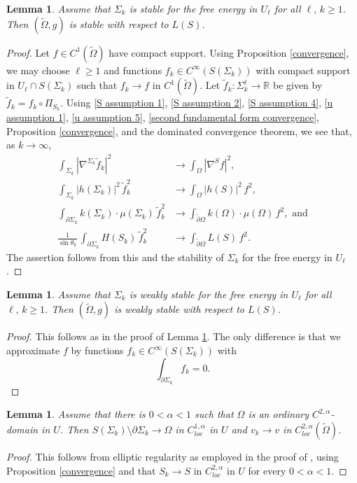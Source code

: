 \documentclass[11pt]{amsart}
\newtheorem{lem}[prop]{Lemma}
\begin{document}
\begin{lem} \label{stability lem} Assume that $\Sigma_k$ is stable for the free energy in $U_\ell$ for all $\ell,\,k\geq 1$.
 Then $(\tilde \Omega,g)$ is stable with respect to $L(S)$.  
\end{lem}
\begin{proof}
	Let $f\in C^1(\tilde \Omega)$ have compact support.
 Using Proposition \ref{convergence},  we may choose $\ell \geq 1$ and functions $f_k\in C^\infty(S(\Sigma_k))$ with compact support in $U_\ell\cap S(\Sigma_k)$ such that $f_k\to f$ in $C^1(\tilde \Omega)$. Let $\tilde f_k:\Sigma^{\ell}_k\to \mathbb{R}$ be given by $\tilde f_k=f_k\circ \Pi_{S_k}$. Using \eqref{S assumption 1}, \eqref{S assumption 2}, \eqref{S assumption 4}, \eqref{u assumption 1}, \eqref{u assumption 5}, \eqref{second fundamental form convergence},  Proposition \ref{convergence}, and the dominated convergence theorem, we see that, as $k\to\infty$,
\begin{align*} 
		\int_{\Sigma_k}|\nabla^{\Sigma_k}\tilde f_k|^2&\to \int_{\Omega}|\nabla^S f|^2,\\
		\int_{\Sigma_k}|h( \Sigma_k)|^2\,\tilde f_k^2&\to \int_{\Omega} |h(S)|^2\,f^2,\\
	\int_{\partial \Sigma_k}k( \Sigma_k)\cdot \mu(\Sigma_k)\,\tilde f_k^2&\to \int_{\tilde \partial \Omega}k( \Omega)\cdot \mu(\Omega)\,f^2,\text{ and}\\
	\frac{1}{\sin\theta_k}\,\int_{ \partial \Sigma_k}H(S_k)\,\tilde f_k^2&\to \int_{\tilde \partial \Omega} L(S)\,f^2.
	\end{align*}
The assertion follows from this and the stability of $\Sigma_k$ for the free energy in $U_\ell$.	
\end{proof}
\begin{lem} \label{weak stability lem} Assume that $\Sigma_k$ is weakly stable for the free energy in $U_\ell$ for all $\ell,\,k\geq 1$.
Then $(\tilde \Omega,g)$ is weakly stable with respect to $L(S)$.  
\end{lem}
\begin{proof}
This follows as in the proof of Lemma \ref{stability lem}. The only difference is that we approximate $f$  by functions $f_k\in C^\infty(S(\Sigma_k))$ with 
$$
\int_{\partial \Sigma_k}f_k=0.
$$ 
\end{proof}
\begin{lem} \label{hodo graph}
	Assume that there is $0<\alpha<1$ such that $\Omega$ is an ordinary $C^{2,\alpha}$-domain in $U$. Then $S(\Sigma_k)\setminus \partial \Sigma_k\to\Omega$ in $C^{1,\alpha}_{loc}$ in $U$ and $v_k\to v$ in $C^{2,\alpha}_{loc}(\tilde \Omega)$. 
\end{lem}
\begin{proof}
	This follows from elliptic regularity as employed in the proof of \cite[Proposition 4.11]{chodoshedelenli}, using Proposition \ref{convergence} and that $S_k\to S$ in $C^{2,\alpha}_{loc}$ in $U$ for every $0<\alpha<1$.
\end{proof}
\end{document}
